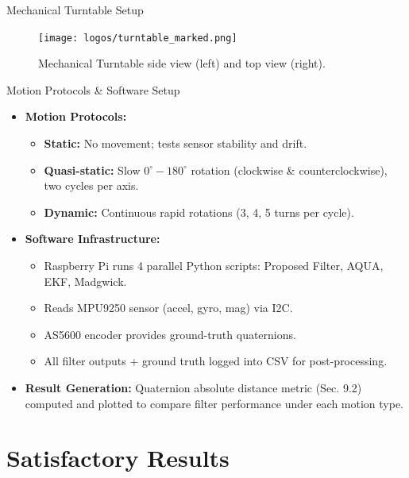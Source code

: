 \documentclass[aspectratio=169,xcolor=dvipsnames]{beamer}
\begin{document}
  \begin{frame}{Mechanical Turntable Setup}
  \begin{figure}
    \centering
    \texttt{[image: logos/turntable\_marked.png]}  
    \caption{Mechanical Turntable side view (left) and top view (right).}    
    \label{fig:turntable}
  \end{figure}
  \end{frame}
  
  
  \begin{frame}{Motion Protocols \& Software Setup}
  \begin{itemize}
      \item \textbf{Motion Protocols:}
      \begin{itemize}
          \item \textbf{Static:} No movement; tests sensor stability and drift.  
          \item \textbf{Quasi-static:} Slow $0^{\circ}\!\!-\!180^{\circ}$ rotation (clockwise \& counterclockwise), two cycles per axis.  
          \item \textbf{Dynamic:} Continuous rapid rotations (3, 4, 5 turns per cycle).
      \end{itemize}
  
      \item \textbf{Software Infrastructure:}  
      \begin{itemize}
          \item Raspberry Pi runs 4 parallel Python scripts: Proposed Filter, AQUA, EKF, Madgwick.  
          \item Reads MPU9250 sensor (accel, gyro, mag) via I2C.  
          \item AS5600 encoder provides ground-truth quaternions.  
          \item All filter outputs + ground truth logged into CSV for post-processing.
      \end{itemize}
  
      \item \textbf{Result Generation:}  
      Quaternion absolute distance metric (Sec. 9.2) computed and plotted to compare filter performance under each motion type.
  \end{itemize}
  \end{frame}

\section{Satisfactory Results}
\end{document}
